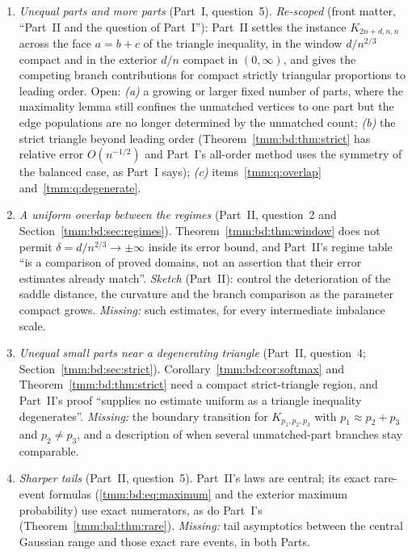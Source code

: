 \documentclass[11pt,letterpaper]{article}
\theoremstyle{remark}\newtheorem{remark}[theorem]{Remark}
\begin{document}
\begin{enumerate}
\item\label{tmm:q:unequal} \emph{Unequal parts and more parts} (Part~I, question~5). \emph{Re-scoped} (front matter, ``Part~II and the question of Part~I''): Part~II settles the instance $K_{2n+d,n,n}$ across the face $a=b+c$ of the triangle inequality, in the window $d/n^{2/3}$ compact and in the exterior $d/n$ compact in $(0,\infty)$, and gives the competing branch contributions for compact strictly triangular proportions to leading order. Open: \emph{(a)} a growing or larger fixed number of parts, where the maximality lemma still confines the unmatched vertices to one part but the edge populations are no longer determined by the unmatched count; \emph{(b)} the strict triangle beyond leading order (Theorem~\ref{tmm:bd:thm:strict} has relative error $O(n^{-1/2})$ and Part~I's all-order method uses the symmetry of the balanced case, as Part~I says); \emph{(c)} items~\ref{tmm:q:overlap} and~\ref{tmm:q:degenerate}.
\item\label{tmm:q:overlap} \emph{A uniform overlap between the regimes} (Part~II, question~2 and Section~\ref{tmm:bd:sec:regimes}). Theorem~\ref{tmm:bd:thm:window} does not permit $\delta=d/n^{2/3}\to\pm\infty$ inside its error bound, and Part~II's regime table ``is a comparison of proved domains, not an assertion that their error estimates already match''. \emph{Sketch} (Part~II): control the deterioration of the saddle distance, the curvature and the branch comparison as the parameter compact grows. \emph{Missing:} such estimates, for every intermediate imbalance scale.
\item\label{tmm:q:degenerate} \emph{Unequal small parts near a degenerating triangle} (Part~II, question~4; Section~\ref{tmm:bd:sec:strict}). Corollary~\ref{tmm:bd:cor:softmax} and Theorem~\ref{tmm:bd:thm:strict} need a compact strict-triangle region, and Part~II's proof ``supplies no estimate uniform as a triangle inequality degenerates''. \emph{Missing:} the boundary transition for $K_{p_1,p_2,p_3}$ with $p_1\approx p_2+p_3$ and $p_2\ne p_3$, and a description of when several unmatched-part branches stay comparable.
\item\label{tmm:q:tails} \emph{Sharper tails} (Part~II, question~5). Part~II's laws are central; its exact rare-event formulas (\eqref{tmm:bd:eq:maximum} and the exterior maximum probability) use exact numerators, as do Part~I's (Theorem~\ref{tmm:bal:thm:rare}). \emph{Missing:} tail asymptotics between the central Gaussian range and those exact rare events, in both Parts.

\end{enumerate}
\end{document}
